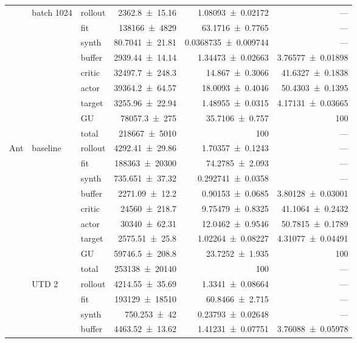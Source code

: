 {\begin{longtable}{@{}lllrrr@{}}
    \addlinespace[2pt]
     & batch 1024 & rollout & \num{2362.8+-15.16} & \num{1.08093+-0.02172} & --- \\
     &  & fit & \num{138166+-4829} & \num{63.1716+-0.7765} & --- \\
     &  & synth & \num{80.7041+-21.81} & \num{0.0368735+-0.009744} & --- \\
     &  & buffer & \num{2939.44+-14.14} & \num{1.34473+-0.02663} & \num{3.76577+-0.01898} \\
     &  & critic & \num{32497.7+-248.3} & \num{14.867+-0.3066} & \num{41.6327+-0.1838} \\
     &  & actor & \num{39364.2+-64.57} & \num{18.0093+-0.4046} & \num{50.4303+-0.1395} \\
     &  & target & \num{3255.96+-22.94} & \num{1.48955+-0.0315} & \num{4.17131+-0.03665} \\
     &  & GU & \num{78057.3+-275} & \num{35.7106+-0.757} & 100 \\
     &  & total & \num{218667+-5010} & \num{100} & --- \\
    \addlinespace[2pt]
    \midrule
    Ant & baseline & rollout & \num{4292.41+-29.86} & \num{1.70357+-0.1243} & --- \\
     &  & fit & \num{188363+-20300} & \num{74.2785+-2.093} & --- \\
     &  & synth & \num{735.651+-37.32} & \num{0.292741+-0.0358} & --- \\
     &  & buffer & \num{2271.09+-12.2} & \num{0.90153+-0.0685} & \num{3.80128+-0.03001} \\
     &  & critic & \num{24560+-218.7} & \num{9.75479+-0.8325} & \num{41.1064+-0.2432} \\
     &  & actor & \num{30340+-62.31} & \num{12.0462+-0.9546} & \num{50.7815+-0.1789} \\
     &  & target & \num{2575.51+-25.8} & \num{1.02264+-0.08227} & \num{4.31077+-0.04491} \\
     &  & GU & \num{59746.5+-208.8} & \num{23.7252+-1.935} & 100 \\
     &  & total & \num{253138+-20140} & \num{100} & --- \\
    \addlinespace[2pt]
     & UTD 2 & rollout & \num{4214.55+-35.69} & \num{1.3341+-0.08664} & --- \\
     &  & fit & \num{193129+-18510} & \num{60.8466+-2.715} & --- \\
     &  & synth & \num{750.253+-42} & \num{0.23793+-0.02648} & --- \\
     &  & buffer & \num{4463.52+-13.62} & \num{1.41231+-0.07751} & \num{3.76088+-0.05978} \\

\end{longtable}}
